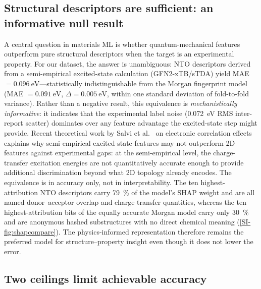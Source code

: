 \subsection{Structural descriptors are sufficient: an informative null result}\label{subsec:nto_null}

A central question in materials ML is whether quantum-mechanical features outperform
pure structural descriptors when the target is an experimental property.
For our dataset, the answer is unambiguous: NTO descriptors derived from a
semi-empirical excited-state calculation (GFN2-xTB/sTDA) yield
MAE $= \qty{0.096}{\electronvolt}$---statistically indistinguishable from the
Morgan fingerprint model (MAE $= \qty{0.091}{\electronvolt}$, $\Delta = \qty{0.005}{\electronvolt}$,
within one standard deviation of fold-to-fold variance).
Rather than a negative result, this equivalence is \emph{mechanistically informative}:
it indicates that the experimental label noise (\qty{0.072}{\electronvolt} RMS
inter-report scatter) dominates over any feature advantage the excited-state step might
provide. Recent theoretical work by Salvi et al.~\cite{Salvi2025} on electronic correlation
effects explains why semi-empirical excited-state features may not outperform 2D features
against experimental gaps: at the semi-empirical level, the charge-transfer excitation
energies are not quantitatively accurate enough to provide additional discrimination
beyond what 2D topology already encodes.
The equivalence is in accuracy only, not in interpretability. The ten highest-attribution NTO
descriptors carry \qty{79}{\percent} of the model's SHAP weight and are all named
donor--acceptor overlap and charge-transfer quantities, whereas the ten
highest-attribution bits of the equally accurate Morgan model carry only
\qty{30}{\percent} and are anonymous hashed substructures with no direct chemical
meaning (\cref{SI-fig:shapcompare}). The physics-informed representation therefore remains
the preferred model for structure--property insight even though it does not lower
the error.

\subsection{Two ceilings limit achievable accuracy}\label{subsec:ceilings}

